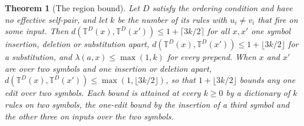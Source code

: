 \documentclass[11pt,a4paper]{article}
\theoremstyle{definition}
\theoremstyle{plain}
\newtheorem{theorem}{Theorem}
\newcommand{\T}{\mathbb{T}}
\begin{document}
\begin{theorem}[The region bound]\label{thm:region}
Let \(D\) satisfy the ordering condition and have no effective self-pair, and let \(k\) be the number of its rules with
\(u_i \ne v_i\) that fire on some input. Then \(d(\T^D(x), \T^D(x')) \le 1 + \lceil 3k/2 \rceil\) for all \(x, x'\) one
symbol insertion, deletion or substitution apart, \(d(\T^D(x), \T^D(x')) \le 1 + \lfloor 3k/2 \rfloor\) for a
substitution, and \(\lambda(a, x) \le \max(1, k)\) for every prepend. When \(x\) and \(x'\) are over two symbols and one
insertion or deletion apart, \(d(\T^D(x), \T^D(x')) \le \max(1, \lfloor 3k/2 \rfloor)\), so that
\(1 + \lfloor 3k/2 \rfloor\) bounds any one edit over two symbols. Each bound is attained at every \(k \ge 0\) by a
dictionary of \(k\) rules on two symbols, the one-edit bound by the insertion of a third symbol and the other three on
inputs over the two symbols.
\end{theorem}
\end{document}

